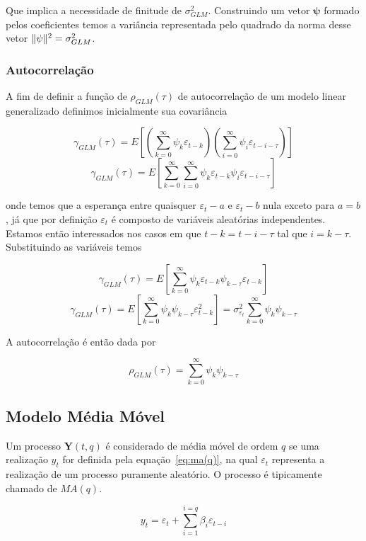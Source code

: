 Que implica a necessidade de finitude de $\sigma^2_{GLM}$. Construindo um
vetor $\mathbf{\psi}$ formado pelos coeficientes temos a variância representada
pelo quadrado da norma desse vetor $\lVert\psi\rVert^2 = \sigma^2_{GLM}$.

\subsubsection{Autocorrelação}

A fim de definir a função de $\rho_{GLM}(\tau)$ de autocorrelação de um modelo
linear generalizado definimos inicialmente sua covariância

$$\gamma_{GLM}(\tau) = E\left[\left(\sum^{\infty}_{k=0} \psi_k \varepsilon_{t-k}\right)\left(\sum^{\infty}_{i=0} \psi_i \varepsilon_{t-i-\tau}\right)  \right] $$
$$\gamma_{GLM}(\tau) = E\left[\sum^{\infty}_{k=0} \sum^{\infty}_{i=0} \psi_k \varepsilon_{t-k} \psi_i \varepsilon_{t-i-\tau}\right] $$

onde temos que a esperança entre quaisquer $\varepsilon_t-a$ e $\varepsilon_t-b$
nula exceto para $a = b$, já que por definição $\varepsilon_t$ é composto de
variáveis aleatórias independentes. Estamos então interessados nos casos em que
$t-k = t-i-\tau$ tal que $i = k - \tau$. Substituindo as variáveis temos

$$\gamma_{GLM}(\tau) = E\left[\sum^{\infty}_{k=0} \psi_{k} \varepsilon_{t-k} \psi_{k-\tau} \varepsilon_{t-k}\right] $$
$$\gamma_{GLM}(\tau) = E\left[\sum^{\infty}_{k=0} \psi_{k}\psi_{k-\tau} \varepsilon_{t-k}^2\right] = \sigma^2_{\varepsilon_t}\sum^{\infty}_{k=0}\psi_{k}\psi_{k-\tau} $$

A autocorrelação é então dada por

$$ \rho_{GLM}(\tau) = \sum^{\infty}_{k=0}\psi_{k}\psi_{k-\tau} $$

\subsection{Modelo Média Móvel}

Um processo ${\mathbf{Y}(t, q)}$ é considerado de média móvel de ordem $q$ se uma
realização $y_t$ for definida pela equação~\ref{eq:ma(q)}, na qual
$\varepsilon_t$ representa a realização de um processo puramente aleatório. O
processo é tipicamente chamado de $MA(q)$.

\begin{equation}\label{eq:ma(q)}
    y_t = \varepsilon_t + \sum_{i=1}^{i=q} \beta_i \varepsilon_{t-i}
\end{equation}


